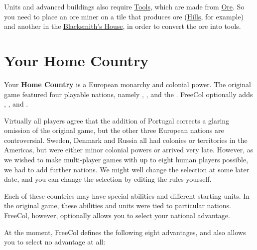 \documentclass[12pt]{book}
\begin{document}
Units and advanced buildings also require \hyperlink{Tools}{Tools},
which are made from \hyperlink{Ore}{Ore}. So you need to place an ore
miner on a tile that produces ore (\hyperlink{Hills}{Hills}, for
example) and another in the \hyperlink{Blacksmith's
House}{Blacksmith's House}, in order to convert the ore into tools.



\hypertarget{Home Country}{\chapter{Your Home Country}}

Your \textbf{Home Country} is a European monarchy and colonial
power. The original game featured four playable nations, namely
, ,  and the
. FreeCol optionally adds
, ,  and
.

Virtually all players agree that the addition of Portugal corrects a
glaring omission of the original game, but the other three European
nations are controversial. Sweden, Denmark and Russia all had colonies
or territories in the Americas, but were either minor colonial powers
or arrived very late. However, as we wished to make multi-player games
with up to eight human players possible, we had to add further
nations. We might well change the selection at some later date, and
you can change the selection by editing the rules yourself.

Each of these countries may have special abilities and different
starting units. In the original game, these abilities and units were
tied to particular nations. FreeCol, however, optionally allows you to
select your national advantage.

At the moment, FreeCol defines the following eight advantages, and also
allows you to select no advantage at all:
\end{document}
